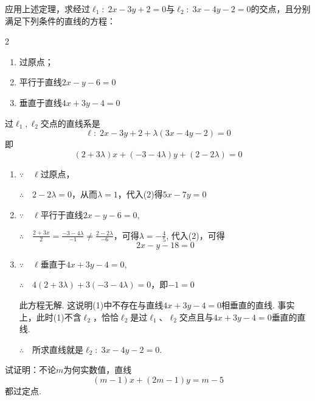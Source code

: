 \begin{example}
    应用上述定理，求经过$\ell_1:\; 2x-3y+2=0$与$\ell_2:\; 3x-4y-2=0$的交点，且分别满足下列条件的直线的方程：
\begin{multicols}{2}
\begin{enumerate}[(1)]
    \item 过原点；
    \item 平行于直线$2x-y-6=0$
    \item 垂直于直线$4x+3y-4=0$
\end{enumerate}
\end{multicols}

\end{example}

\begin{solution}
过$\ell_1,\ell_2$交点的直线系是
\begin{equation}
    \ell:\; 2x-3y+2+\lambda(3x-4y-2)=0 \tag{1}
\end{equation}
即
\begin{equation}
  (2+3\lambda)x+(-3-4\lambda)y+(2-2\lambda)=0 \tag{2}  
\end{equation}
\begin{enumerate}[(1)]
    \item $\because\quad \ell$过原点，

    $\therefore\quad 2-2\lambda=0$，从而$\lambda=1$，代入(2)得$5x-7y=0$

\item $\because\quad \ell$平行于直线$2x-y-6=0$,

$\therefore\quad \frac{2+3x}{2}=\frac{-3-4\lambda}{-1}\ne \frac{2-2\lambda}{-6}$，可得$\lambda=-\frac{4}{5}$, 代入(2)，可得
\[2x-y-18=0\]
\item $\because\quad \ell$垂直于$4x+3y-4=0$,

$\therefore\quad 4(2+3\lambda)+3(-3-4\lambda)=0$，即$-1=0$

此方程无解. 这说明(1)中不存在与直线$4x+3y-4=0$相垂直的直线. 事实上，此时(1)不含$\ell_2$，恰恰$\ell_2$是过$\ell_1$、$\ell_2$交点且与$4x+3y-4=0$垂直的直线.

$\therefore\quad $所求直线就是$\ell_2:\; 3x-4y-2=0$.
\end{enumerate}
\end{solution}

\begin{example}
    试证明：不论$m$为何实数值，直线
\begin{equation}
     (m-1)x+(2m-1)y=m-5  \tag{*}
\end{equation}
都过定点.
\end{example}

